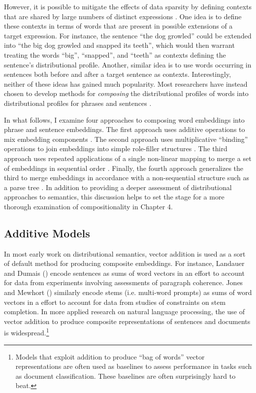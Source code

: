 However, it is possible to mitigate the effects of data sparsity by defining contexts that are shared by large numbers of distinct expressions \citep[][p. 261]{Baroni:2014}. One idea is to define these contexts in terms of words that are present in possible extensions of a target expression. For instance, the sentence ``the dog growled'' could be extended into ``the big dog growled and snapped its teeth'', which would then warrant treating the words ``big'', ``snapped'', and ``teeth'' as contexts defining the sentence's distributional profile. Another, similar idea is to use words occurring in sentences both before and after a target sentence as contexts. Interestingly, neither of these ideas has gained much popularity. Most researchers have instead chosen to develop methods for \textit{composing} the distributional profiles of words into distributional profiles for phrases and sentences \citep{Mitchell:2010,Baroni:2014}.

In what follows, I examine four approaches to composing word embeddings into phrase and sentence embeddings. The first approach uses additive operations to mix embedding components \citep{Mitchell:2010,Mikolov:2013}. The second approach uses multiplicative ``binding'' operations to join embeddings into simple role-filler structures \citep{SmolenskyLegendre:2006,Plate:2003,Eliasmith:2013,Smolensky:1990}. The third approach uses repeated applications of a single non-linear mapping to merge a set of embeddings in sequential order \citep{Elman:1990,Elman:1991}. Finally, the fourth approach generalizes the third to merge embeddings in accordance with a non-sequential structure such as a parse tree \citep{Socher:2014,Socher:2011,Tai:2015,Socher:2012,Iyyer:2014,Bottou:2014}. In addition to providing a deeper assessment of distributional approaches to semantics, this discussion helps to set the stage for a more thorough examination of compositionality in Chapter 4. 

\subsection{Additive Models}

In most early work on distributional semantics, vector addition is used as a sort of default method for producing composite embeddings. For instance, Landauer and Dumais (\citeyear{LandauerDumais:1997}) encode sentences as sums of word vectors in an effort to account for data from experiments involving assessments of paragraph coherence. Jones and Mewhort (\citeyear{JonesMewhort:2007}) similarly encode stems (i.e. multi-word prompts) as sums of word vectors in a effort to account for data from studies of constraints on stem completion. In more applied research on natural language processing, the use of vector addition to produce composite representations of sentences and documents is widespread.\footnote{Models that exploit addition to produce ``bag of words'' vector representations are often used as baselines to assess performance in tasks such as document classification. These baselines are often surprisingly hard to beat.} 

